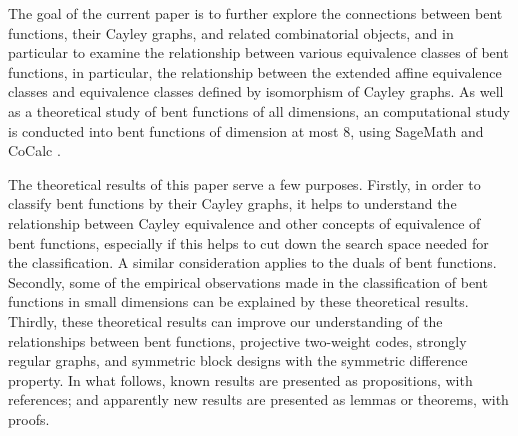 \documentclass[12pt,a4paper]{article}
\begin{document}
The goal of the current paper is to further explore the connections between bent functions, their
Cayley graphs, and related combinatorial objects,
and in particular to examine the relationship between various equivalence classes of bent
functions, in particular, the relationship between the extended affine
equivalence classes and equivalence classes defined by isomorphism of Cayley graphs.
As well as a theoretical study of bent functions of all dimensions, an computational study is conducted
into bent functions of dimension at most 8,
using SageMath \cite{SageMath7517} and CoCalc \cite{CoCalc}.

The theoretical results of this paper serve a few purposes.
Firstly, in order to classify bent functions by their Cayley graphs,
it helps to understand the relationship between Cayley equivalence and other concepts of equivalence
of bent functions, especially if this helps to cut down the search space needed for the
classification.
A similar consideration applies to the duals of bent functions.
Secondly, some of the empirical observations made in the classification of bent functions in small
dimensions can be explained by these theoretical results.
Thirdly, these theoretical results can improve our understanding of the relationships between
bent functions, projective two-weight codes, strongly regular graphs, and
symmetric block designs with the symmetric difference property.
In what follows, known results are presented as propositions, with references;
and apparently new results are presented as lemmas or theorems, with proofs.
\end{document}
